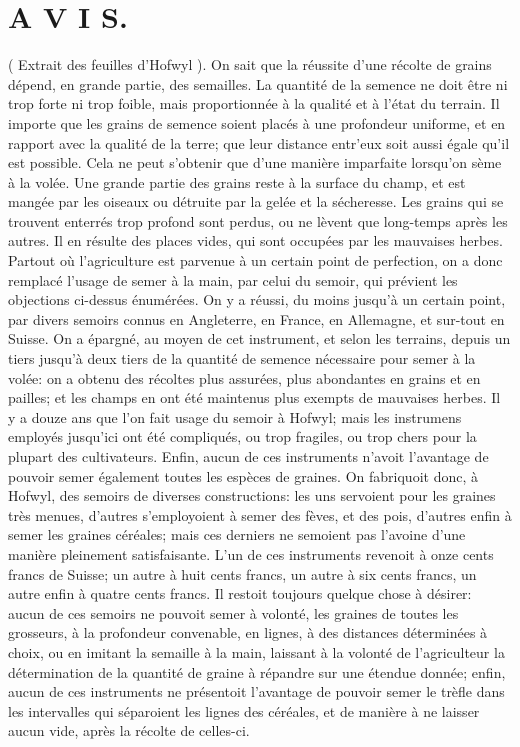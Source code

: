 \section{A V I S.}
( Extrait des feuilles d'Hofwyl ).
On sait que la réussite d'une récolte de grains dépend, en grande partie, des semailles. La quantité de la semence ne doit être ni trop forte ni trop foible, mais proportionnée à la qualité et à l'état du terrain. Il importe que les grains de semence\setcounter{page}{114} soient placés à une profondeur uniforme, et en rapport avec la qualité de la terre; que leur distance entr'eux soit aussi égale qu'il est possible. Cela ne peut s'obtenir que d'une manière imparfaite lorsqu'on sème à la volée. Une grande partie des grains reste à la surface du champ, et est mangée par les oiseaux ou détruite par la gelée et la sécheresse. Les grains qui se trouvent enterrés trop profond sont perdus, ou ne lèvent que long-temps après les autres. Il en résulte des places vides, qui sont occupées par les mauvaises herbes.
Partout où l'agriculture est parvenue à un certain point de perfection, on a donc remplacé l'usage de semer à la main, par celui du semoir, qui prévient les objections ci-dessus énumérées. On y a réussi, du moins jusqu'à un certain point, par divers semoirs connus en Angleterre, en France, en Allemagne, et sur-tout en Suisse. On a épargné, au moyen de cet instrument, et selon les terrains, depuis un tiers jusqu'à deux tiers de la quantité de semence nécessaire pour semer à la volée: on a obtenu des récoltes plus assurées, plus abondantes en grains et en pailles; et les champs en ont été maintenus plus exempts de mauvaises herbes.
Il y a douze ans que l'on fait usage du semoir à Hofwyl; mais les instrumens employés\setcounter{page}{115} jusqu'ici ont été compliqués, ou trop fragiles, ou trop chers pour la plupart des cultivateurs. Enfin, aucun de ces instruments n'avoit l'avantage de pouvoir semer également toutes les espèces de graines. On fabriquoit donc, à Hofwyl, des semoirs de diverses constructions: les uns servoient pour les graines très menues, d'autres s'employoient à semer des fèves, et des pois, d'autres enfin à semer les graines céréales; mais ces derniers ne semoient pas l'avoine d'une manière pleinement satisfaisante. L'un de ces instruments revenoit à onze cents francs de Suisse; un autre à huit cents francs, un autre à six cents francs, un autre enfin à quatre cents francs. Il restoit toujours quelque chose à désirer: aucun de ces semoirs ne pouvoit semer à volonté, les graines de toutes les grosseurs, à la profondeur convenable, en lignes, à des distances déterminées à choix, ou en imitant la semaille à la main, laissant à la volonté de l'agriculteur la détermination de la quantité de graine à répandre sur une étendue donnée; enfin, aucun de ces instruments ne présentoit l'avantage de pouvoir semer le trèfle dans les intervalles qui séparoient les lignes des céréales, et de manière à ne laisser aucun vide, après la récolte de celles-ci.
